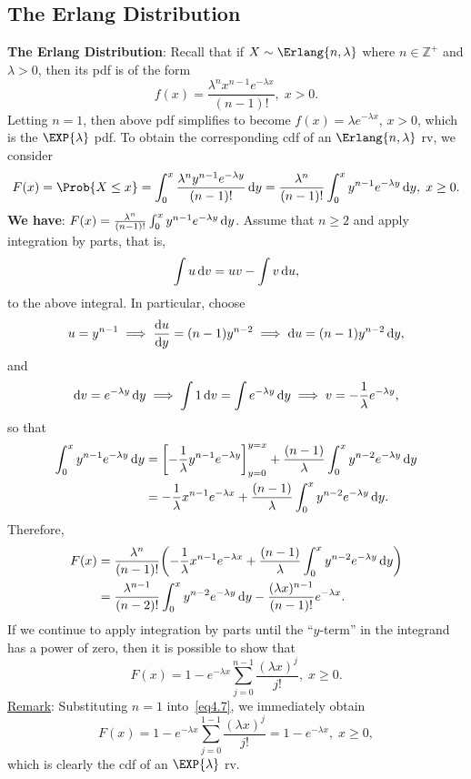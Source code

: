 \subsection*{The Erlang Distribution}
\begin{Regular}
    \textbf{The Erlang Distribution}: Recall that if $ X \sim \Erlang{n,\lambda} $ where $ n\in\mathbb{Z}^+ $ and $ \lambda>0 $, then its pdf is of the form
    \[ f(x)=\frac{\lambda^n x^{n-1}e^{-\lambda x}}{(n-1)!},\;x>0. \]
    Letting $ n=1 $, then above pdf simplifies to become $ f(x)=\lambda e^{-\lambda x} $, $ x>0 $, which is the $ \EXP{\lambda} $ pdf. To
    obtain the corresponding cdf of an $ \Erlang{n,\lambda} $ rv, we consider
    \[ F(x)=\Prob{X\le x}=\int_{0}^{x}\frac{\lambda^n y^{n-1}e^{-\lambda y}}{(n-1)!}\odif{y}=
        \frac{\lambda^n}{(n-1)!}\int_{0}^{x}y^{n-1}e^{-\lambda y}\odif{y},\; x\ge 0. \]
    \textbf{We have}: $ F(x)=\frac{\lambda^n}{(n-1)!}\int_{0}^{x}y^{n-1}e^{-\lambda y}\odif{y} $. Assume that $ n\ge 2 $ and apply integration by parts, that is,
    \[ \int u\odif{v}=uv-\int v\odif{u}, \]
    to the above integral. In particular, choose
    \[ u=y^{n-1}\implies \odv{u}{y}=(n-1)y^{n-2}\implies\odif{u}=(n-1)y^{n-2}\odif{y}, \]
    and
    \[ \odif{v}=e^{-\lambda y}\odif{y}\implies \int 1\odif{v}=\int e^{-\lambda y}\odif{y}\implies v=-\frac{1}{\lambda}e^{-\lambda y}, \]
    so that
    \begin{align*}
        \int_{0}^{x}y^{n-1}e^{-\lambda y}\odif{y}
         & =\biggl[-\frac{1}{\lambda}y^{n-1}e^{-\lambda y}\biggr]_{y=0}^{y=x}+\frac{(n-1)}{\lambda}\int_{0}^{x}y^{n-2}e^{-\lambda y}\odif{y} \\
         & =-\frac{1}{\lambda}x^{n-1}e^{-\lambda x}+\frac{(n-1)}{\lambda}\int_{0}^{x}y^{n-2}e^{-\lambda y}\odif{y}.
    \end{align*}
    Therefore,
    \begin{align*}
        F(x)
         & =\frac{\lambda^n}{(n-1)!}\biggl(-\frac{1}{\lambda}x^{n-1}e^{-\lambda x}+\frac{(n-1)}{\lambda}\int_{0}^{x}y^{n-2}e^{-\lambda y}\odif{y}\biggr) \\
         & =\frac{\lambda^{n-1}}{(n-2)!}\int_{0}^{x}y^{n-2}e^{-\lambda y}\odif{y}-\frac{(\lambda x)^{n-1}}{(n-1)!}e^{-\lambda x}.
    \end{align*}
    If we continue to apply integration by parts until the ``$ y $-term'' in the integrand has a power of zero, then it is possible to show that
    \[ F(x)=1-e^{-\lambda x}\sum_{j=0}^{n-1}\frac{(\lambda x)^j}{j!},\; x\ge 0.\tag*{(4.7)}\label{eq4.7} \]
    \tcblower{}
    \underline{Remark}: Substituting $ n=1 $ into~\ref{eq4.7}, we immediately obtain
    \[ F(x)=1-e^{-\lambda x}\sum_{j=0}^{1-1}\frac{(\lambda x)^j}{j!}=1-e^{-\lambda x},\; x\ge 0, \]
    which is clearly the cdf of an $ \EXP{\lambda} $ rv.


\end{Regular}

